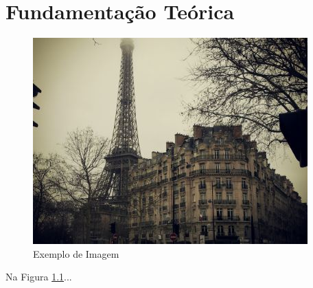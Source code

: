 \chapter[Fundamentação Teórica]{Fundamentação Teórica}

\begin{figure}[h]
\centering
\includegraphics[width=.8\textwidth]{images/figura.jpg}
\caption{Exemplo de Imagem}
\label{fig:figura_1}
\end{figure}

Na Figura \ref{fig:figura_1}...